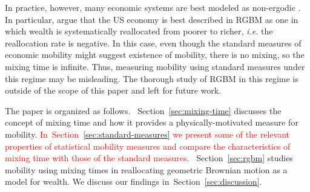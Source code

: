 \documentclass[11pt]{article}
\newcommand{\Sref}[1]{Section~\ref{sec:#1}}
\newcommand{\ie}{{\it i.e.}\xspace}
\newcommand{\fref}[1]{Fig.~\ref{fig:#1}}
\numberwithin{equation}{section}
\begin{document}
In practice, however, many economic systems are best modeled as non-ergodic \citep{Peters2019b}. In particular, \citet{BermanPetersAdamou2019} argue that the US economy is best described in RGBM as one in which wealth is systematically reallocated from poorer to richer, \ie the reallocation rate is negative. In this case, even though the standard measures of economic mobility might suggest existence of mobility, there is no mixing, so the mixing time is infinite. Thus, measuring mobility using standard measures under this regime may be misleading. The thorough study of RGBM in this regime is outside of the scope of this paper and left for future work.

The paper is organized as follows. ~\Sref{mixing-time} discusses the concept of mixing time and how it provides a physically-motivated measure for mobility. \textcolor{red}{In~\Sref{standard-measures} we present some of the relevant properties of statistical mobility measures and compare the characteristics of mixing time with those of the standard measures.} ~\Sref{rgbm} studies mobility using mixing times in reallocating geometric Brownian motion as a model for wealth. We discuss our findings in~\Sref{discussion}.




\end{document}
